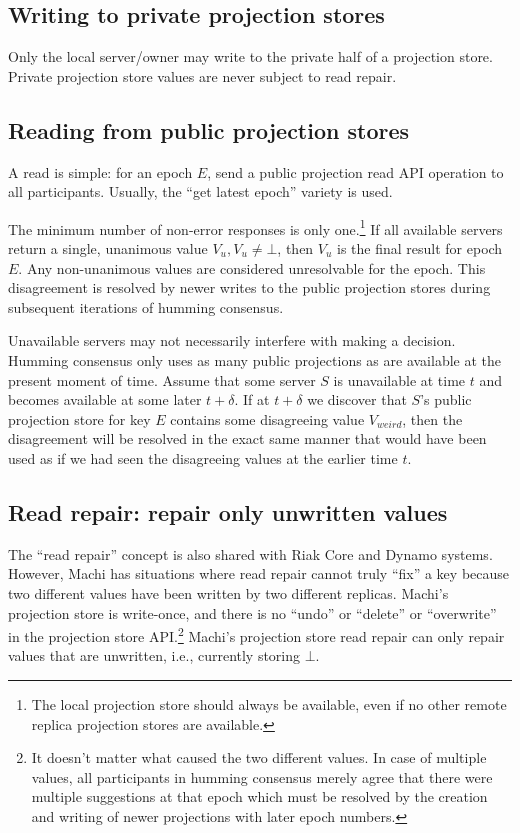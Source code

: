 \documentclass[preprint,10pt]{sigplanconf}
\begin{document}
\subsection{Writing to private projection stores}

Only the local server/owner may write to the private half of a
projection store.  Private projection store values are never subject
to read repair.

\subsection{Reading from public projection stores}
\label{sub:proj-store-reading}

A read is simple: for an epoch $E$, send a public projection read API
operation to all participants.  Usually, the ``get latest epoch''
variety is used.

The minimum number of non-error responses is only one.\footnote{The local
projection store should always be available, even if no other remote
replica projection stores are available.}  If all available servers
return a single, unanimous value $V_u, V_u \ne \bot$, then $V_u$ is
the final result for epoch $E$.
Any non-unanimous values are considered unresolvable for the
epoch.  This disagreement is resolved by newer
writes to the public projection stores during subsequent iterations of
humming consensus.

Unavailable servers may not necessarily interfere with making a decision.
Humming consensus
only uses as many public projections as are available at the present
moment of time.  Assume that some server $S$ is unavailable at time $t$ and
becomes available at some later $t+\delta$.
If at $t+\delta$ we
discover that $S$'s public projection store for key $E$
contains some disagreeing value $V_{weird}$, then the disagreement
will be resolved in the exact same manner that would have been used as if we
had seen the disagreeing values at the earlier time $t$.

\subsection{Read repair: repair only unwritten values}

The ``read repair'' concept is also shared with Riak Core and Dynamo
systems.  However, Machi has situations where read repair cannot truly
``fix'' a key because two different values have been written by two
different replicas.
Machi's projection store is write-once, and there is no ``undo'' or
``delete'' or ``overwrite'' in the projection store API.\footnote{It doesn't
matter what caused the two different values.  In case of multiple
values, all participants in humming consensus merely agree that there
were multiple suggestions at that epoch which must be resolved by the
creation and writing of newer projections with later epoch numbers.}
Machi's projection store read repair can only repair values that are
unwritten, i.e., currently storing $\bot$.
\end{document}
